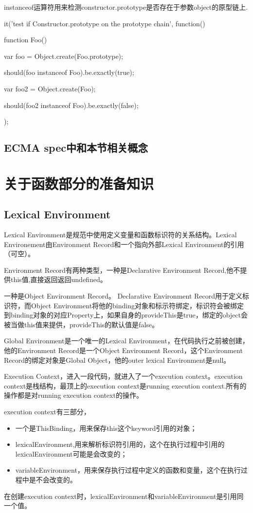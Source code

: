 instanceof运算符用来检测constructor.prototype是否存在于参数object的原型链上.
\begin{JavaScript}
		it('test if Constructor.prototype on the prototype chain', function(){
			function Foo(){}

			var foo = Object.create(Foo.prototype);

			should(foo instanceof Foo).be.exactly(true);

			var foo2 = Object.create(Foo);

			should(foo2 instanceof Foo).be.exactly(false);
		});
\end{JavaScript}
	
\subsection{ECMA spec中和本节相关概念}
\section{关于函数部分的准备知识}
\subsection{Lexical Environment}

Lexical Environment是规范中使用定义变量和函数标识符的关系结构。Lexical Environement由Environment Record和一个指向外部Lexical Environment的引用（可空）。

Environment Record有两种类型，一种是Declarative Environment Record,他不提供this值,直接返回返回undefined。

一种是Object Environment Record。 Declarative Environment Record用于定义标识符，而Object Environment将他的binding对象和标示符绑定，标识符会被绑定到binding对象的对应Property上，如果自身的provideThis是true，绑定的object会被当做this值来提供，provideThis的默认值是false。

Global Environment是一个唯一的Lexical Environment，在代码执行之前被创建，他的Environment Record是一个Object Environment Record，这个Environment Record的绑定对象是Global Object，他的outer lexical Environment是null。


Execution Context，进入一段代码，就进入了一个execution context。execution context是栈结构，最顶上的execution context是running execution context.所有的操作都是对running execution context的操作。

execution context有三部分，
\begin{itemize}
\item 一个是ThisBinding，用来保存this这个keyword引用的对象；
\item lexicalEnvironment,用来解析标识符引用的，这个在执行过程中引用的lexicalEnvironment可能是会改变的；
\item variableEnvironment，用来保存执行过程中定义的函数和变量，这个在执行过程中是不会改变的。
\end{itemize}
在创建execution context时，lexicalEnvironment和variableEnvironment是引用同一个值。

